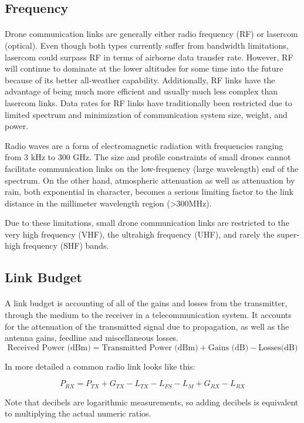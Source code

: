 \subsection*{Frequency}
\paragraph{}
Drone communication links are generally either radio frequency (RF) or lasercom (optical). Even though both types currently suffer from bandwidth limitations, lasercom could surpass RF in terms of airborne data transfer rate. However, RF will continue to dominate at the lower altitudes for some time into the future because of its better all-weather capability. Additionally, RF links have the advantage of being much more efficient and usually much less complex than lasercom links.
Data rates for RF links have traditionally been restricted due to limited spectrum and
minimization of communication system size, weight, and power.

Radio waves are a form of electromagnetic radiation with frequencies ranging from 3 kHz to 300 GHz. The size and profile constraints of small drones cannot facilitate communication links on the low-frequency (large wavelength) end of the spectrum. 
On the other hand, atmospheric attenuation as well as attenuation by rain, both
exponential in character, becomes a serious limiting factor to the link distance in
the millimeter wavelength region (>300MHz). 
	
Due to these limitations, small drone communication links are restricted to the very high frequency (VHF), the ultrahigh frequency (UHF), and rarely the super-high frequency (SHF) bands.

\subsection*{Link Budget}
\paragraph{}
A link budget is accounting of all of the gains and losses from the transmitter, through the medium  to the receiver in a telecommunication system. It accounts for the attenuation of the transmitted signal due to propagation, as well as the antenna gains, feedline and miscellaneous losses. 
\begin{equation*}\label{eq:link_budget} 
 		\text{Received Power (dBm)} = \text{Transmitted Power (dBm)} + \text{Gains (dB)} - \text{Losses(dB)}
\end{equation*}

In more detailed a common radio link looks like this:

\begin{equation*}\label{eq:link_budget} 
 		P_{RX} = P_{TX} + G_{TX} - L_{TX} - L_{FS} - L_{M} + G_{RX} - L_{RX}
\end{equation*}

Note that decibels are logarithmic measurements, so adding decibels is equivalent to multiplying the actual numeric ratios.